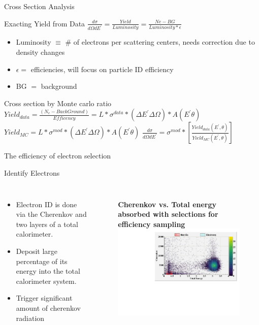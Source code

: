 \documentclass{beamer}
\begin{document}
\begin{frame}{Cross Section Analysis}
	\begin{block}{Exacting Yield from Data}
		\centering
		$\frac{d\sigma}{d\Omega dE^\prime} =  \frac{Yield}{Luminosity} = \frac{Ne - BG }{Luminosity *  \epsilon} $
		\begin{itemize}
			\item Luminosity $\equiv$ \# of electrons per scattering centers, needs correction due to density changes
			\item $\epsilon = $ efficiencies, will focus on particle ID efficiency 
			\item  BG $ = $ background
		\end{itemize}
	\end{block}	
	\begin{block}{Cross section by Monte carlo ratio}	
		$ Yield_{data} = \frac{\left(N_e - BackGround\right)}{Efficency } =  \textit{L} *\sigma^{data} * \left( \Delta E^\prime \Delta \Omega\right)*  A \left(E^\prime \theta \right)$
		$ Yield_{MC} = \textit{L} *\sigma^{mod} * \left( \Delta E^\prime \Delta \Omega\right)*  A \left(E^\prime \theta \right)$
		\centering $ \frac{d\sigma}{d\Omega dE^\prime} = \sigma^{mod} * \left[\frac{Yield_{data} \left( 
			E^\prime,\theta\right)} {Yield_{MC}\left(E^\prime,\theta\right)}\right] $
	\end{block}	
\end{frame}
\begin{frame}{The efficiency of electron selection}
	\begin{block}{Identify Electrons}
		\begin{columns}
			\begin{itemize}
 		 		\setlength{\parskip}{0pt}
				\setlength{\itemsep}{0pt plus 1pt}
				\item Electron ID is done via the Cherenkov and two layers of a total calorimeter.
				\item Deposit large percentage of its energy into the total calorimeter system.
				\item Trigger significant amount of cherenkov radiation
			\end{itemize}		
			\begin{figure}
					\textbf{Cherenkov vs. Total energy absorbed with selections for efficiency sampling }
					\includegraphics[width=7.0cm]{../images/PID_2d.pdf}
			\end{figure}
		\end{columns}
	\end{block}
\end{frame}
\end{document}
